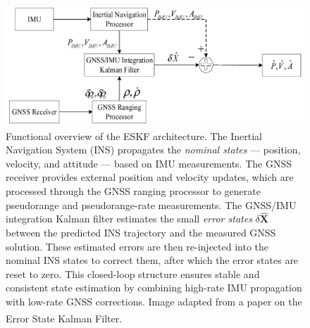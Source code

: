 \begin{figure}[H]
    \centering
    \includegraphics[width=1.0\linewidth]{Pictures/State_Estimation/Error_State_Kalman_Filter/Error_State_Kalman_Filter_Illustrated.png}
    \caption{Functional overview of the ESKF architecture. The Inertial Navigation System (INS) propagates the \textit{nominal states} --- position, velocity, and attitude --- based on IMU measurements. The GNSS receiver provides external position and velocity updates, which are processed through the GNSS ranging processor to generate pseudorange and pseudorange-rate measurements. The GNSS/IMU integration Kalman filter estimates the small \textit{error states} $\delta\hat{\mathbf{X}}$ between the predicted INS trajectory and the measured GNSS solution. These estimated errors are then re-injected into the nominal INS states to correct them, after which the error states are reset to zero. This closed-loop structure ensures stable and consistent state estimation by combining high-rate IMU propagation with low-rate GNSS corrections. Image adapted from a paper on the Error State Kalman Filter.\textsuperscript{\cite{error_state_kalman_filter}}}
    \label{fig:state-estimation-error-state-kalman-filter}
\end{figure}

